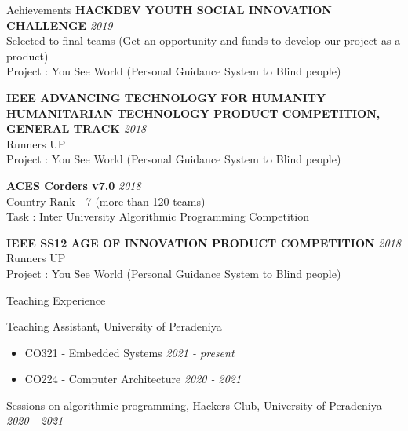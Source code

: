 \documentclass{resume} %
\begin{document}
\begin{rSection}{Achievements}
{\bf HACKDEV YOUTH SOCIAL INNOVATION CHALLENGE } \hfill {\em 2019}
\\Selected to final teams (Get an opportunity and funds to develop our project as a product)
\\Project : You See World (Personal Guidance System to Blind people)

{\bf IEEE ADVANCING TECHNOLOGY FOR HUMANITY HUMANITARIAN TECHNOLOGY PRODUCT COMPETITION, GENERAL TRACK } \hfill {\em 2018}
\\Runners UP
\\Project : You See World (Personal Guidance System to Blind people)

{\bf ACES Corders v7.0 } \hfill {\em 2018}
\\Country Rank - 7 (more than 120 teams)
\\Task : Inter University Algorithmic Programming Competition

{\bf IEEE SS12 AGE OF INNOVATION PRODUCT COMPETITION} \hfill {\em 2018}
\\Runners UP
\\Project : You See World (Personal Guidance System to Blind people)

\end{rSection}





\begin{rSection}{Teaching Experience} \itemsep -3pt
\item Teaching Assistant, University of Peradeniya 
\begin{itemize}
    \item CO321 - Embedded Systems \hfill {\em 2021 - present} 
    \item CO224 - Computer Architecture \hfill {\em 2020 - 2021} 
\end{itemize}
\item Sessions on algorithmic programming, Hackers Club, University of Peradeniya \hfill {\em 2020 - 2021} 
\end{rSection}
\end{document}
